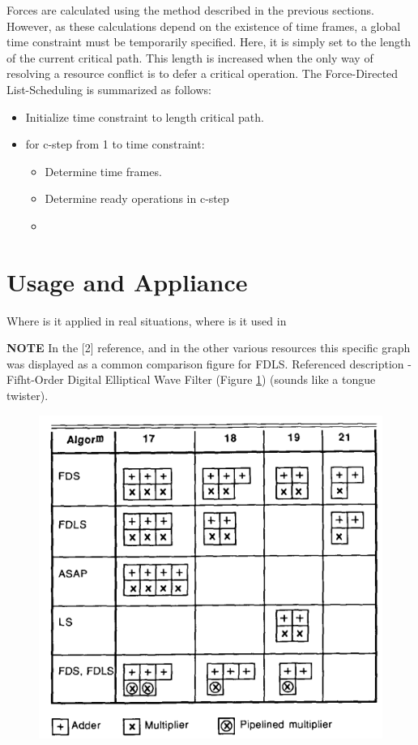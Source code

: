 \documentclass[conference]{IEEEtran}
\begin{document}
Forces are calculated using the method described in the previous sections. However, as these calculations depend on the existence of time frames, a global time constraint must be temporarily specified. Here, it is simply set to the length of the current critical path. This length is increased when the only way of resolving a resource conflict is to defer a critical operation. The Force-Directed List-Scheduling is summarized as follows:

\begin{itemize}
    \item Initialize time constraint to length critical path.
    \item for c-step from 1 to time constraint:
    \begin{itemize}
        \item Determine time frames.
        \item Determine ready operations in c-step
        \item 
    \end{itemize}
\end{itemize}


\section{Usage and Appliance}
Where is it applied in real situations, where is it used in

\textbf{NOTE} In the [2] reference, and in the other various resources this specific graph was displayed as a common comparison figure for FDLS. Referenced description - Fifht-Order Digital Elliptical Wave Filter (Figure \ref{wavefilter}) (sounds like a tongue twister).

\begin{figure}[htbp]
\centerline{\includegraphics[scale=.5]{Result_Applience.png}}
\caption{}
\label{wavefilter}
\end{figure}
\end{document}
